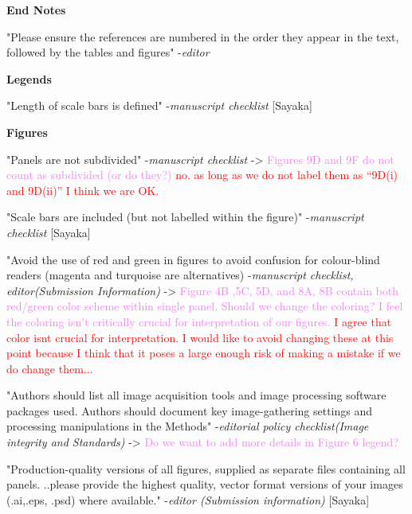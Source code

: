 \documentclass[11pt,letterpaper]{report}
\newcommand{\cmark}{\ding{51}}%
\newcommand{\done}{\rlap{$\square$}{\raisebox{2pt}{\large\hspace{1pt}\cmark}}%
\hspace{-2.5pt}}
\begin{document}
\textbf{End Notes}
\begin{todolist}
\item[\done]"Please ensure the references are numbered in the order they appear in the text, followed by the tables and figures" -\textit{editor}
\end{todolist}

 \textbf{Legends}
 \begin{todolist}
 \item[\done] "Length of scale bars is defined" -\textit{manuscript checklist} \textcolor{BlueGreen}{[Sayaka]}
 \end{todolist}

\textbf{Figures}
\begin{todolist}
\item[\done] "Panels are not subdivided" -\textit{manuscript checklist} -> \textcolor{violet}{Figures 9D and 9F do not count as subdivided (or do they?) } \textcolor{red}{no. as long as we do not label them as ``9D(i) and 9D(ii)'' I think we are OK.}
\item[\done] "Scale bars are included (but not labelled within the figure)" -\textit{manuscript checklist} \textcolor{BlueGreen}{[Sayaka]}
\item[\done] "Avoid the use of red and green in figures to avoid confusion for colour-blind readers (magenta and turquoise are alternatives) -\textit{manuscript checklist, editor(Submission Information)} -> \textcolor{violet}{Figure 4B ,5C, 5D, and 8A, 8B contain both red/green color scheme within single panel. Should we change the coloring? I feel the coloring isn't critically crucial for interpretation of our figures. } \textcolor{red}{I agree that color isnt crucial for interpretation. I would like to avoid changing these at this point because I think that it poses a large enough risk of making a mistake if we do change them...}
\item[\done] "Authors should list all image acquisition tools and image processing software packages used. Authors should document key image-gathering settings and processing manipulations in the Methods" -\textit{editorial policy checklist(Image integrity and Standards)} -> \textcolor{violet}{Do we want to add more details in Figure 6 legend?}
\item[\done] "Production-quality versions of all figures, supplied as separate files containing all panels. ..please provide the highest quality, vector format versions of your images (.ai,.eps, .psd) where available." -\textit{editor (Submission information)} \textcolor{BlueGreen}{[Sayaka]}

\end{todolist}
\end{document}
